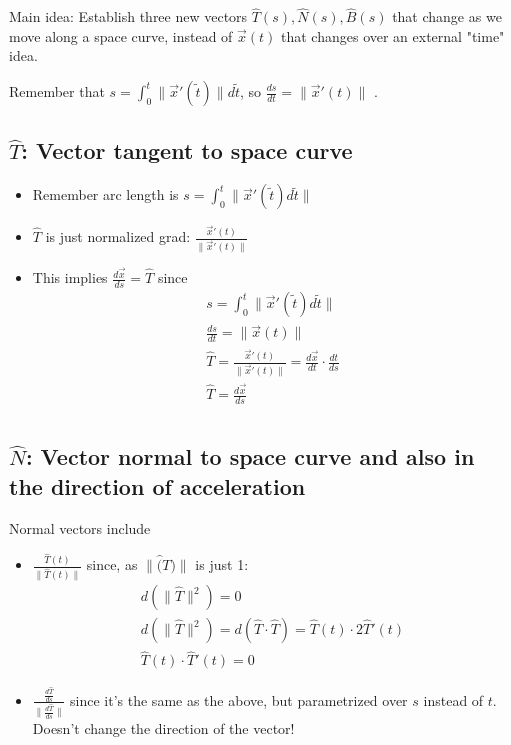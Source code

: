 \documentclass[11pt, oneside]{article}   	%
\begin{document}
Main idea: Establish three new vectors $\hat{T}(s), \hat{N}(s), \hat{B}(s)$ that change as we move along a space curve, instead of $\overrightarrow{x}(t)$ that changes over an external "time" idea.

Remember that  $s = \int_0^t \| \overrightarrow{x}'(\tilde{t}) \| d\tilde{t}$, so $\frac{ds}{dt} = \| \overrightarrow{x}'(t)\|$ .

\subsection{$\hat{T}$: Vector tangent to space curve}
\begin{itemize}
\item Remember arc length is $s = \int_0^t \| \overrightarrow{x}'(\tilde{t})d\tilde{t} \|$
\item $\hat{T}$ is just normalized grad: $\frac{\overrightarrow{x}'(t)}{\|\overrightarrow{x}'(t)\|}$
\item This implies $\frac{d\overrightarrow{x}}{ds} = \hat{T}$ since 
\begin{align}
s = \int_0^t \| \overrightarrow{x}'(\tilde{t})d\tilde{t} \| \\
\frac{ds}{dt} = \| \overrightarrow{x}(t) \| \\
\hat{T} = \frac{\overrightarrow{x}'(t)}{\|\overrightarrow{x}'(t)\|}  = \frac{d\overrightarrow{x}}{dt} \cdot \frac{dt}{ds} \\
\hat{T} = \frac{d\overrightarrow{x}}{ds} \\
\end{align}
\end{itemize}


\subsection{$\hat{N}$: Vector normal to space curve and also in the direction of acceleration}
Normal vectors include
\begin{itemize}
\item $\frac{\hat{T}(t)} { \| \hat{T}(t) \|}$ since, as $\| \hat(T) \| $ is just 1:
\begin{align}
d(\| \hat{T} \|^2) = 0 \\
d(\| \hat{T} \|^2) = d(\hat{T} \cdot \hat{T}) = \hat{T}(t) \cdot 2\hat{T}'(t) \\
\hat{T}(t) \cdot \hat{T}'(t)  = 0
\end{align}
\item $\frac{ \frac{d\hat{T}}{ds}  }  { \| \frac{d\hat{T}}{ds}  \| }$ since it's the same as the above, but parametrized over $s$ instead of $t$.  Doesn't change the direction of the vector!
\end{itemize}
\end{document}
